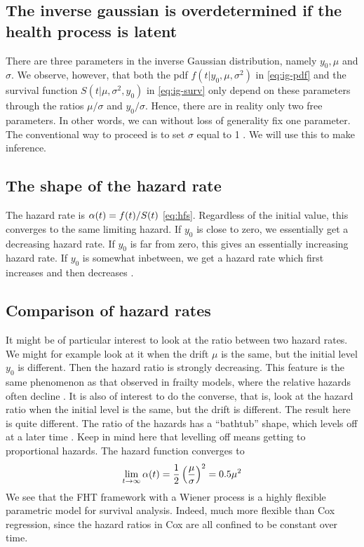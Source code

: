 \subsection{The inverse gaussian is overdetermined if the health process is latent}
There are three parameters in the inverse Gaussian distribution, namely $y_0, \mu$ and $\sigma$.
We observe, however, that both the pdf $f(t|y_0,\mu,\sigma^2)$ in \eqref{eq:ig-pdf} and the survival function $S(t|\mu,\sigma^2,y_0)$ in \eqref{eq:ig-surv} only depend on these parameters through the ratios $\mu/\sigma$ and $y_0/\sigma$.
Hence, there are in reality only two free parameters. In other words, we can without loss of generality fix one parameter. The conventional way to proceed is to set $\sigma$ equal to 1 \citep{leewhitmore2006}. We will use this to make inference.

\subsection{The shape of the hazard rate}
The hazard rate is $\alpha(t)=f(t)/S(t)$ \eqref{eq:hfs}. Regardless of the initial value, this converges to the same limiting hazard. If $y_0$ is close to zero, we essentially get a decreasing hazard rate. If $y_0$ is far from zero, this gives an essentially increasing hazard rate. If $y_0$ is somewhat inbetween, we get a hazard rate which first increases and then decreases \citep{ABG}.

\subsection{Comparison of hazard rates}
It might be of particular interest to look at the ratio between two hazard rates. We might for example look at it when the drift $\mu$ is the same, but the initial level $y_0$ is different. Then the hazard ratio is strongly decreasing. This feature is the same phenomenon as that observed in frailty models, where the relative hazards often decline \citep{ABG}.
It is also of interest to do the converse, that is, look at the hazard ratio when the initial level is the same, but the drift is different. The result here is quite different. The ratio of the hazards has a ``bathtub'' shape, which levels off at a later time \citep{ABG}. Keep in mind here that levelling off means getting to proportional hazards. The hazard function converges to
\begin{equation}
    \lim_{t\to\infty}\alpha(t)=\frac{1}{2}\left(\frac{\mu}{\sigma}\right)^2=0.5\mu^2
\end{equation}
We see that the FHT framework with a Wiener process is a highly flexible parametric model for survival analysis. Indeed, much more flexible than Cox regression, since the hazard ratios in Cox are all confined to be constant over time.

